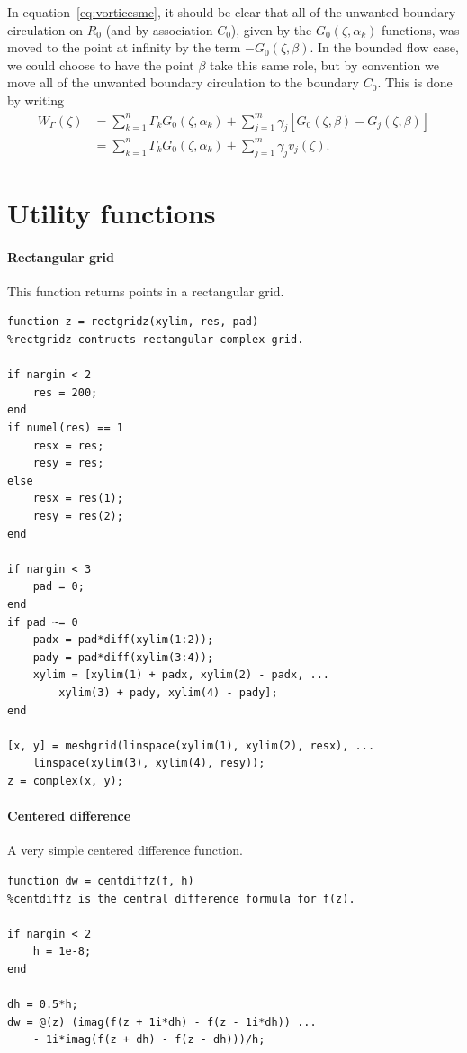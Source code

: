 \documentclass[12pt,fleqn]{article}
\begin{document}
In equation~\eqref{eq:vorticesmc}, it should be clear that all of the unwanted boundary circulation on $R_0$ (and by association $C_0$), given by the $G_0(\zeta,\alpha_k)$ functions, was moved to the point at infinity by the term $-G_0(\zeta,\beta)$. In the bounded flow case, we could choose to have the point $\beta$ take this same role, but by convention we move all of the unwanted boundary circulation to the boundary $C_0$. This is done by writing
\begin{equation}
  \begin{split}
    W_\Gamma(\zeta) &= \sum_{k=1}^n \Gamma_k G_0(\zeta,\alpha_k) + \sum_{j=1}^m \gamma_j \left[ G_0(\zeta,\beta) - G_j(\zeta,\beta) \right] \\
    &= \sum_{k=1}^n \Gamma_k G_0(\zeta,\alpha_k) + \sum_{j=1}^m \gamma_j v_j(\zeta).
  \end{split}
  \label{eq:bvorticesmc}
\end{equation}




\clearpage
\appendix

\section{Utility functions}
\paragraph{Rectangular grid}
This function returns points in a rectangular grid.
\begin{lstlisting}
function z = rectgridz(xylim, res, pad)
%rectgridz contructs rectangular complex grid.

if nargin < 2
    res = 200;
end
if numel(res) == 1
    resx = res;
    resy = res;
else
    resx = res(1);
    resy = res(2);
end

if nargin < 3
    pad = 0;
end
if pad ~= 0
    padx = pad*diff(xylim(1:2));
    pady = pad*diff(xylim(3:4));
    xylim = [xylim(1) + padx, xylim(2) - padx, ...
        xylim(3) + pady, xylim(4) - pady];
end

[x, y] = meshgrid(linspace(xylim(1), xylim(2), resx), ...
    linspace(xylim(3), xylim(4), resy));
z = complex(x, y);
\end{lstlisting}

\paragraph{Centered difference}
A very simple centered difference function.
\begin{lstlisting}
function dw = centdiffz(f, h)
%centdiffz is the central difference formula for f(z).

if nargin < 2
    h = 1e-8;
end

dh = 0.5*h;
dw = @(z) (imag(f(z + 1i*dh) - f(z - 1i*dh)) ...
    - 1i*imag(f(z + dh) - f(z - dh)))/h;
\end{lstlisting}
\end{document}
